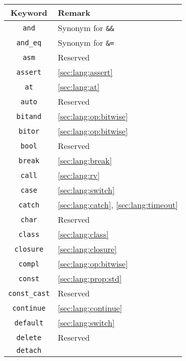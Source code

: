 \else
\begin{tabular}{|c|l|}
  \hline
  Keyword & Remark \\
  \hline
     \lstinline"and" & Synonym for \verb|&&|                    \\
  \lstinline"and_eq" & Synonym for \verb|&=|                    \\
     \lstinline"asm" & Reserved                                 \\
  \lstinline"assert" & \autoref{sec:lang:assert}                \\
      \lstinline"at" & \autoref{sec:lang:at}                    \\
    \lstinline"auto" & Reserved                                 \\
  \lstinline"bitand" & \autoref{sec:lang:op:bitwise}            \\
   \lstinline"bitor" & \autoref{sec:lang:op:bitwise}            \\
    \lstinline"bool" & Reserved                                 \\
   \lstinline"break" & \autoref{sec:lang:break}                 \\
    \lstinline"call" & \autoref{sec:lang:rv}                    \\
    \lstinline"case" & \autoref{sec:lang:switch}                \\
   \lstinline"catch" & \autoref{sec:lang:catch}, \autoref{sec:lang:timeout} \\
    \lstinline"char" & Reserved                                 \\
   \lstinline"class" & \autoref{sec:lang:class}                 \\
 \lstinline"closure" & \autoref{sec:lang:closure}               \\
   \lstinline"compl" & \autoref{sec:lang:op:bitwise}            \\
   \lstinline"const" & \autoref{sec:lang:prop:std}              \\
\lstinline"const_cast" & Reserved                                 \\
\lstinline"continue" & \autoref{sec:lang:continue}              \\
 \lstinline"default" & \autoref{sec:lang:switch}                \\
  \lstinline"delete" & Reserved                                 \\
  \lstinline"detach" &                                          \\

\end{tabular}
